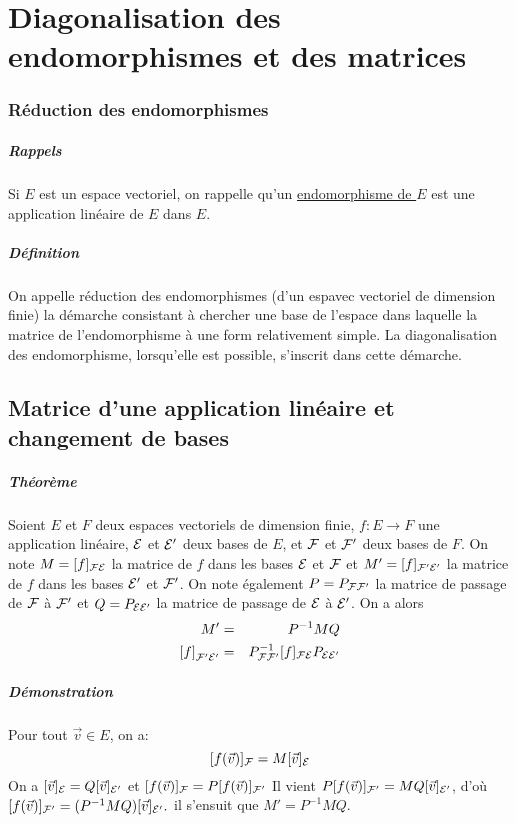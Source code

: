 \chapter{Diagonalisation des endomorphismes et des matrices}

%
\subsection{Réduction des endomorphismes}
%
\paragraph{Rappels} Si $E$ est un espace vectoriel, on rappelle qu'un \underline{endomorphisme de $E$} est une application linéaire de $E$ dans $E$.

\paragraph{Définition} On appelle réduction des endomorphismes (d'un espavec vectoriel de dimension finie) la démarche consistant à chercher une base de l'espace dans laquelle la matrice de l'endomorphisme à une form relativement simple. La diagonalisation des endomorphisme, lorsqu'elle est possible, s'inscrit dans cette démarche.

%
%
\section{Matrice d'une application linéaire et changement de bases}
%
%

\paragraph{Théorème} Soient $E$ et $F$ deux espaces vectoriels de dimension finie, $f: E \rightarrow F$ une application linéaire, $\mathcal{E}$ et $\mathcal{E}'$ deux bases de $E$, et $\mathcal{F}$ et $\mathcal{F}'$ deux bases de $F$. On note $M = [f]_{\mathcal{F} \mathcal{E}}$ la matrice de $f$ dans les bases $\mathcal{E}$ et $\mathcal{F}$ et $M' = [f]_{\mathcal{F}' \mathcal{E}'}$ la matrice de $f$ dans les bases $\mathcal{E}'$ et $\mathcal{F}'$. On note également $P = P_{\mathcal{F} \mathcal{F}'}$ la matrice de passage de $\mathcal{F}$ à $\mathcal{F}'$ et $Q = P_{\mathcal{E} \mathcal{E}'}$ la matrice de passage de $\mathcal{E}$ à $\mathcal{E}'$. On a alors 
\begin{eqnarray*}
  M' &=& P^{-1} M Q \\
  \left[f\right]_{\mathcal{F}' \mathcal{E}'} &=& P_{\mathcal{F} \mathcal{F}'}^{-1} [f]_{\mathcal{F} \mathcal{E}} P_{\mathcal{E} \mathcal{E}'}
\end{eqnarray*}

\paragraph{Démonstration} Pour tout $\vec{v} \in E$, on a:
$$[f(\vec{v})]_{\mathcal{F}} = M [\vec{v}]_{\mathcal{E}}$$
On a $[\vec{v}]_{\mathcal{E}} = Q [\vec{v}]_{\mathcal{E}'}$ et $[f(\vec{v})]_{\mathcal{F}} = P [f(\vec{v})]_{\mathcal{F}'}$ Il vient $P [f(\vec{v})]_{\mathcal{F}'} = M Q [\vec{v}]_{\mathcal{E}'}$, d'où $[f(\vec{v})]_{\mathcal{F}'} = (P^{-1} M Q ) [\vec{v}]_{\mathcal{E}'}.$ il s'ensuit que $M' = P^{-1} M Q$.


